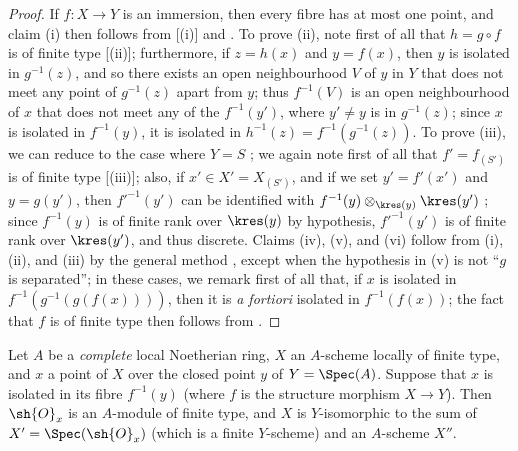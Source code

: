 \begin{proof}
If $f:X\to Y$ is an immersion, then every fibre has at most one point, and claim (i) then follows from [(i)] and .
To prove (ii), note first of all that $h=g\circ f$ is of finite type [(ii)];
furthermore, if $z=h(x)$ and $y=f(x)$, then $y$ is isolated in $g^{-1}(z)$, and so there exists an open neighbourhood $V$ of $y$ in $Y$ that does not meet any point of $g^{-1}(z)$ apart from $y$;
thus $f^{-1}(V)$ is an open neighbourhood of $x$ that does not meet any of the $f^{-1}(y')$, where $y'\neq y$ is in $g^{-1}(z)$;
since $x$ is isolated in $f^{-1}(y)$, it is isolated in $h^{-1}(z)=f^{-1}(g^{-1}(z))$.
To prove (iii), we can reduce to the case where $Y=S$ ;
we again note first of all that $f'=f_{(S')}$ is of finite type [(iii)];
also, if $x'\in X'=X_{(S')}$, and if we set $y'=f'(x')$ and $y=g(y')$, then ${f'}^{-1}(y')$ can be identified with $f^{-1}(y)\otimes_{\kres(y)}\kres(y')$ ;
since $f^{-1}(y)$ is of finite rank over $\kres(y)$ by hypothesis, ${f'}^{-1}(y')$ is of finite rank over $\kres(y')$, and thus discrete.
Claims (iv), (v), and (vi) follow from (i), (ii), and (iii) by the general method , except when the hypothesis in (v) is not ``$g$ is separated'';
in these cases, we remark first of all that, if $x$ is isolated in $f^{-1}(g^{-1}(g(f(x))))$, then it is \emph{a fortiori} isolated in $f^{-1}(f(x))$;
the fact that $f$ is of finite type then follows from .
\end{proof}

\begin{proposition}[6.2.5]
\label{II.6.2.5}
Let $A$ be a \emph{complete} local Noetherian ring, $X$ an $A$-scheme locally of finite type, and $x$ a point of $X$ over the closed point $y$ of $Y=\Spec(A)$.
Suppose that $x$ is isolated in its fibre $f^{-1}(y)$ (where $f$ is the structure morphism $X\to Y$).
Then $\sh{O}_x$ is an $A$-module of finite type, and $X$ is $Y$-isomorphic to the sum  of $X'=\Spec(\sh{O}_x)$ (which is a finite $Y$-scheme) and an $A$-scheme $X''$.
\end{proposition}

